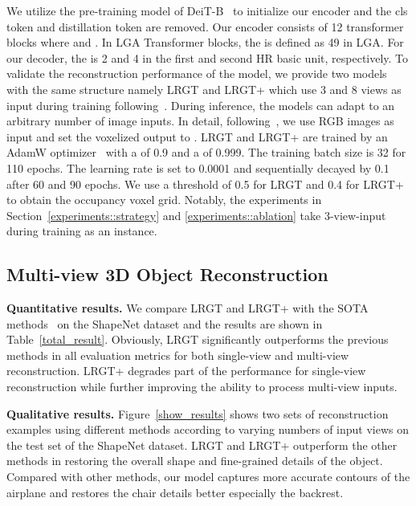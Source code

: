 \documentclass[10pt,twocolumn,letterpaper]{article}
\begin{document}
We utilize the pre-training model of DeiT-B~\cite{touvron2021training} to initialize our encoder and the cls token and distillation token are removed. Our encoder consists of 12 transformer blocks where  and . In LGA Transformer blocks, the  is defined as 49 in LGA. For our decoder, the  is 2 and 4 in the first and second HR basic unit, respectively. To validate the reconstruction performance of the model, we provide two models with the same structure namely LRGT and LRGT+ which use 3 and 8 views as input during training following~\cite{zhu2023garnet, zhu2023umi}. During inference, the models can adapt to an arbitrary number of image inputs. In detail, following~\cite{xie2020pix2vox++}, we use  RGB images as input and set the voxelized output to . LRGT and LRGT+ are trained by an AdamW optimizer~\cite{loshchilov2018decoupled} with a  of 0.9 and a  of 0.999. The training batch size is 32 for 110 epochs. The learning rate is set to 0.0001 and sequentially decayed by 0.1 after 60 and 90 epochs. We use a threshold of 0.5 for LRGT and 0.4 for LRGT+ to obtain the occupancy voxel grid. Notably, the experiments in Section~\ref{experiments::strategy} and \ref{experiments::ablation} take 3-view-input during training as an instance.

\subsection{Multi-view 3D Object Reconstruction}
\textbf{Quantitative results.} We compare LRGT and LRGT+ with the SOTA methods~\cite{choy20163d,yang2020robust,xie2020pix2vox++,wang2021multi,yagubbayli2021legoformer,shi20213d,zhu2023umi,zhu2023garnet} on the ShapeNet dataset and the results are shown in Table~\ref{total_result}. Obviously, LRGT significantly outperforms the previous methods in all evaluation metrics for both single-view and multi-view reconstruction. LRGT+ degrades part of the performance for single-view reconstruction while further improving the ability to process multi-view inputs.



\textbf{Qualitative results.} Figure~\ref{show_results} shows two sets of reconstruction examples using different methods according to varying numbers of input views on the test set of the ShapeNet dataset. LRGT and LRGT+ outperform the other methods in restoring the overall shape and fine-grained details of the object. Compared with other methods, our model captures more accurate contours of the airplane and restores the chair details better especially the backrest.
\end{document}

